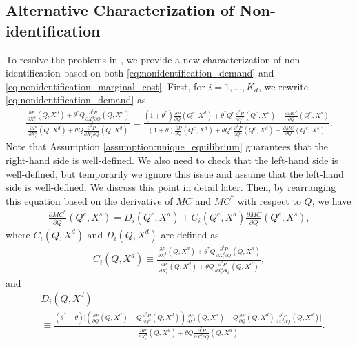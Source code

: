 \documentclass[11pt, a4paper]{article}
\theoremstyle{remark}
\begin{document}
\subsection{Alternative Characterization of Non-identification}
To resolve the problems in \citet{lau1982identifying}, we provide a new characterization of non-identification based on both \eqref{eq:nonidentification_demand} and \eqref{eq:nonidentification_marginal_cost}.
First, for $i = 1, \ldots, K_d$, we rewrite \eqref{eq:nonidentification_demand} as
\begin{align}
    \frac{\frac{\partial P}{\partial X^{d}_i}(Q, X^{d}) + \theta^{*} Q\frac{\partial^2 P}{\partial X^{d}_{i}\partial Q}(Q, X^{d}) }{\frac{\partial P}{\partial X^{d}_i}(Q, X^{d}) + \theta Q\frac{\partial^2 P}{\partial X^{d}_{i}\partial Q}(Q, X^{d}) } = \frac{(1+\theta^{*})\frac{\partial P}{\partial Q}(Q^e, X^{d}) + \theta^{*} Q^e\frac{\partial^2 P}{\partial Q^2}(Q^e, X^{d}) - \frac{\partial MC^{*}}{\partial Q}(Q^e, X^{s})}{(1+\theta)\frac{\partial P}{\partial Q}(Q^e, X^{d}) + \theta Q^e\frac{\partial^2 P}{\partial Q^2}(Q^e, X^{d}) - \frac{\partial MC}{\partial Q}(Q^e, X^{s})}.
\end{align}
Note that Assumption \ref{assumption:unique_equilibrium} guarantees that the right-hand side is well-defined.
We also need to check that the left-hand side is well-defined, but temporarily we ignore this issue and
assume that the left-hand side is well-defined.
We discuss this point in detail later.
Then, by rearranging this equation based on the derivative of $MC$ and $MC^{*}$ with respect to $Q$, we have
\begin{align}
    \frac{\partial MC^{*}}{\partial Q}(Q^e, X^{s}) =D_i(Q^e, X^{d}) + C_i(Q^e, X^{d})\frac{\partial MC}{\partial Q}(Q^e, X^{s}),\label{eq:mc_transformation_quantity}
\end{align}
where $C_i(Q, X^{d})$ and $D_i(Q, X^{d})$ are defined as
\begin{align}
    C_i(Q, X^{d}) \equiv \frac{\frac{\partial P}{\partial X^{d}_i}(Q, X^{d}) + \theta^{*} Q\frac{\partial^2 P}{\partial X^{d}_{i}\partial Q}(Q, X^{d}) }{\frac{\partial P}{\partial X^{d}_i}(Q, X^{d}) + \theta Q\frac{\partial^2 P}{\partial X^{d}_{i}\partial Q}(Q, X^{d}) },\label{eq:ratio_marginal_revenue}
\end{align}
and
\begin{align}
    &D_i(Q, X^{d})\\
    &\equiv\frac{(\theta^{*} - \theta)\Bigg[\left(\frac{\partial P}{\partial Q}(Q, X^{d}) + Q\frac{\partial^2 P}{\partial Q^2}(Q, X^{d})\right) \frac{\partial P}{\partial X^{d}_i}(Q, X^{d}) - Q \frac{\partial P}{\partial Q}(Q, X^{d}) \frac{\partial^2 P}{\partial X^{d}_i\partial Q}(Q, X^{d}) \Bigg]}{\frac{\partial P}{\partial X^{d}_i}(Q, X^{d}) + \theta Q\frac{\partial^2 P}{\partial X^{d}_{i}\partial Q}(Q, X^{d})}.\label{eq:intercation_derivative_demand}
\end{align}
\end{document}
